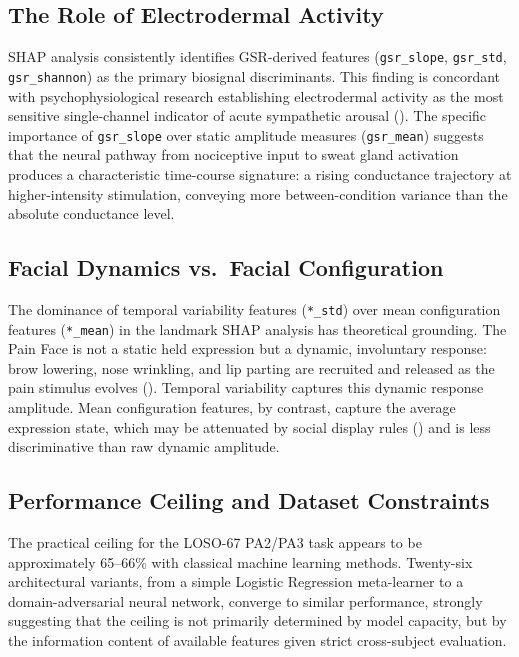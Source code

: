 \documentclass[10pt, twocolumn]{article}
\begin{document}
\subsection{The Role of Electrodermal Activity}

SHAP analysis consistently identifies GSR-derived features (\texttt{gsr\_slope},
\texttt{gsr\_std}, \texttt{gsr\_shannon}) as the primary biosignal discriminants. This
finding is concordant with psychophysiological research establishing electrodermal activity
as the most sensitive single-channel indicator of acute sympathetic arousal
(\cite{Fowles1986}). The specific importance of \texttt{gsr\_slope} over static amplitude
measures (\texttt{gsr\_mean}) suggests that the neural pathway from nociceptive input to
sweat gland activation produces a characteristic time-course signature: a rising
conductance trajectory at higher-intensity stimulation, conveying more between-condition
variance than the absolute conductance level.

\subsection{Facial Dynamics vs.\ Facial Configuration}

The dominance of temporal variability features (\texttt{*\_std}) over mean configuration
features (\texttt{*\_mean}) in the landmark SHAP analysis has theoretical grounding. The
Pain Face is not a static held expression but a dynamic, involuntary response: brow
lowering, nose wrinkling, and lip parting are recruited and released as the pain stimulus
evolves (\cite{Kunz2019}). Temporal variability captures this dynamic response amplitude.
Mean configuration features, by contrast, capture the average expression state, which may
be attenuated by social display rules (\cite{Ekman1978}) and is less discriminative than
raw dynamic amplitude.

\subsection{Performance Ceiling and Dataset Constraints}

The practical ceiling for the LOSO-67 PA2/PA3 task appears to be approximately 65--66\%
with classical machine learning methods. Twenty-six architectural variants, from a simple
Logistic Regression meta-learner to a domain-adversarial neural network, converge to
similar performance, strongly suggesting that the ceiling is not primarily determined by
model capacity, but by the information content of available features given strict
cross-subject evaluation.
\end{document}
